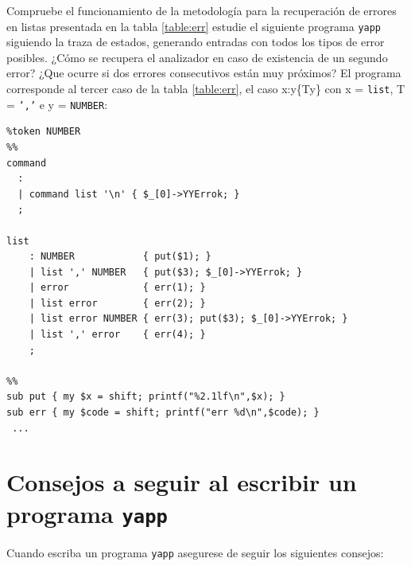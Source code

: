 \begin{exercise} 
Compruebe el funcionamiento de la metodología 
para la recuperación de errores en listas presentada
en la tabla \ref{table:err}
estudie el siguiente programa \verb|yapp| siguiendo la traza de estados,
generando entradas con todos los tipos de error posibles.
¿Cómo se recupera el analizador en caso de existencia de un segundo
error? ¿Que ocurre si dos errores consecutivos 
están muy próximos?
El programa corresponde al tercer caso de la tabla \ref{table:err}, 
el caso x:y\{Ty\} con 
x = {\tt list}, T = {\tt ','} e y = {\tt NUMBER}:
\begin{verbatim}
%token NUMBER
%%
command 
  : 
  | command list '\n' { $_[0]->YYErrok; } 
  ;

list 
    : NUMBER            { put($1); }
    | list ',' NUMBER   { put($3); $_[0]->YYErrok; }
    | error             { err(1); }
    | list error        { err(2); }
    | list error NUMBER { err(3); put($3); $_[0]->YYErrok; }
    | list ',' error    { err(4); }
    ;
    
%%    
sub put { my $x = shift; printf("%2.1lf\n",$x); }
sub err { my $code = shift; printf("err %d\n",$code); }
 ...
\end{verbatim} 
\end{exercise} 

\section{Consejos a seguir al escribir un programa {\tt yapp}}
\label{section:consejosyapp}
Cuando escriba un programa \verb|yapp| asegurese
de seguir los siguientes consejos:

